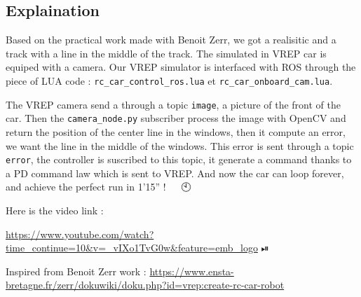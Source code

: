 \subsection{Explaination}

Based on the practical work made with Benoit Zerr, we got a realisitic and a track with a line in the middle of the track.
The simulated in VREP car is equiped with a camera. Our VREP simulator is interfaced with ROS through the piece of LUA code :
\texttt{rc\_car\_control\_ros.lua} et \texttt{rc\_car\_onboard\_cam.lua}.

The VREP camera send a through a topic \texttt{image}, a picture of the front of the car. 
Then the \texttt{camera\_node.py} subscriber process the image with OpenCV and return the position
of the center line in the windows, then it compute an error, we want the line in the middle of the windows. 
This error is sent through a topic \texttt{error}, the controller is suscribed to this topic,
it generate a command thanks to a PD command law which is sent to VREP. And now the car can loop forever, and achieve 
the perfect run in 1'15'' ! 🚙 🏁 🕙


Here is the video link : 


\url{https://www.youtube.com/watch?time_continue=10&v=_vIXo1TvG0w&feature=emb_logo} ⏯

Inspired from Benoit Zerr work : \url{https://www.ensta-bretagne.fr/zerr/dokuwiki/doku.php?id=vrep:create-rc-car-robot}
